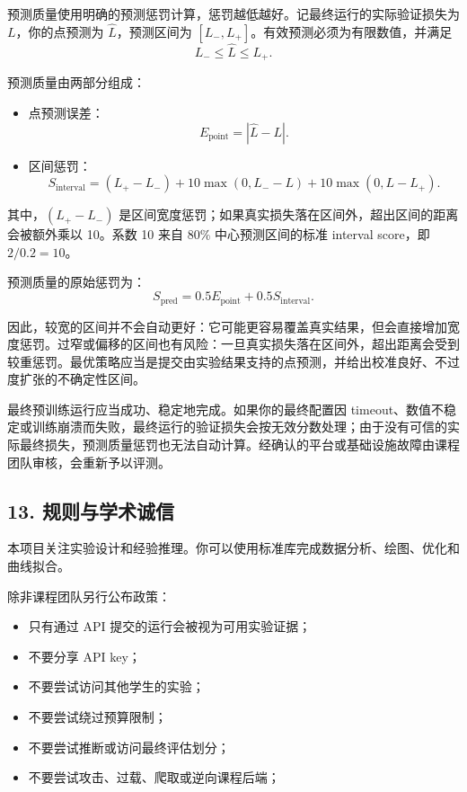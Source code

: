 \documentclass[
  11pt,
]{ctexart}
\providecommand{\tightlist}{%
  \setlength{\itemsep}{0pt}\setlength{\parskip}{0pt}}
\begin{document}
预测质量使用明确的预测惩罚计算，惩罚越低越好。记最终运行的实际验证损失为
\(L\)，你的点预测为 \(\hat{L}\)，预测区间为 \([L_-, L_+]\)。有效预测必须为有限数值，并满足
\[
L_- \le \hat{L} \le L_+.
\]

预测质量由两部分组成：

\begin{itemize}
\tightlist
\item
  点预测误差：
  \[
  E_{\text{point}} = |\hat{L} - L|.
  \]
\item
  区间惩罚：
  \[
  S_{\text{interval}}
  =
  (L_+ - L_-)
  + 10 \max(0, L_- - L)
  + 10 \max(0, L - L_+).
  \]
\end{itemize}

其中，\((L_+ - L_-)\) 是区间宽度惩罚；如果真实损失落在区间外，超出区间的距离会被额外乘以
10。系数 10 来自 80\% 中心预测区间的标准 interval score，即
\(2 / 0.2 = 10\)。

预测质量的原始惩罚为：
\[
S_{\text{pred}}
=
0.5 E_{\text{point}}
+
0.5 S_{\text{interval}}.
\]

因此，较宽的区间并不会自动更好：它可能更容易覆盖真实结果，但会直接增加宽度惩罚。过窄或偏移的区间也有风险：一旦真实损失落在区间外，超出距离会受到较重惩罚。最优策略应当是提交由实验结果支持的点预测，并给出校准良好、不过度扩张的不确定性区间。

最终预训练运行应当成功、稳定地完成。如果你的最终配置因
timeout、数值不稳定或训练崩溃而失败，最终运行的验证损失会按无效分数处理；由于没有可信的实际最终损失，预测质量惩罚也无法自动计算。经确认的平台或基础设施故障由课程团队审核，会重新予以评测。

\hypertarget{ux89c4ux5219ux4e0eux5b66ux672fux8bdaux4fe1}{%
\subsection{13.
规则与学术诚信}\label{ux89c4ux5219ux4e0eux5b66ux672fux8bdaux4fe1}}

本项目关注实验设计和经验推理。你可以使用标准库完成数据分析、绘图、优化和曲线拟合。

除非课程团队另行公布政策：

\begin{itemize}
\tightlist
\item
  只有通过 API 提交的运行会被视为可用实验证据；
\item
  不要分享 API key；
\item
  不要尝试访问其他学生的实验；
\item
  不要尝试绕过预算限制；
\item
  不要尝试推断或访问最终评估划分；
\item
  不要尝试攻击、过载、爬取或逆向课程后端；
\end{itemize}
\end{document}
